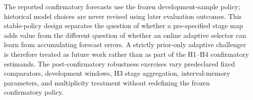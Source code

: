 The reported confirmatory forecasts use the frozen development-sample policy;
historical model choices are never revised using later evaluation outcomes.
This stable-policy design separates the question of whether a pre-specified
stage map adds value from the different question of whether an online adaptive
selector can learn from accumulating forecast errors. A strictly prior-only
adaptive challenger is therefore treated as future work rather than as part of
the H1--H4 confirmatory estimands. The post-confirmatory robustness exercises
vary predeclared fixed comparators, development windows, H3 stage aggregation,
interval-memory parameters, and multiplicity treatment without redefining the
frozen confirmatory policy.
